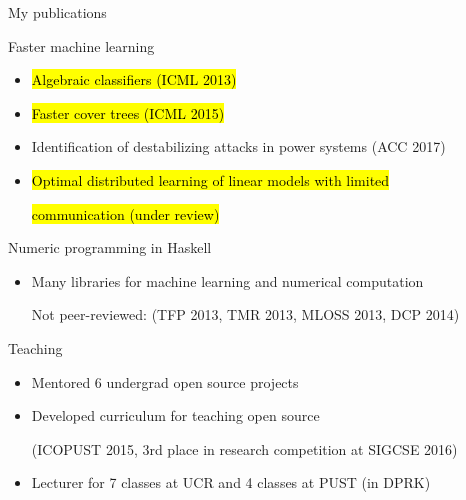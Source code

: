 \begin{frame}{My publications}


%
%
Faster machine learning 
\begin{itemize}
\item \hl{Algebraic classifiers (ICML 2013)}
\item \hl{Faster cover trees (ICML 2015)}
\item Identification of destabilizing attacks in power systems (ACC 2017)
\item \hl{Optimal distributed learning of linear models with limited}

      \hl{communication (under review)}
\end{itemize}

\vspace{0in}
Numeric programming in Haskell
\begin{itemize}
\item Many libraries for machine learning and numerical computation 

Not peer-reviewed: (TFP 2013, TMR 2013, MLOSS 2013, DCP 2014)\!\!\!\!\!\!
\end{itemize}


\vspace{0in}
Teaching 
\begin{itemize}
\item Mentored 6 undergrad open source projects
\item Developed curriculum for teaching open source 
    
    (ICOPUST 2015, 3rd place in research competition at SIGCSE 2016)
\item Lecturer for 7 classes at UCR and 4 classes at PUST (in DPRK)
\end{itemize}

\end{frame}

%


